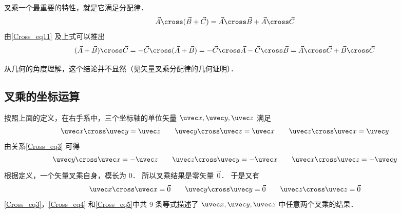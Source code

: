 叉乘一个最重要的特性，就是它满足分配律．
\begin{equation}\label{Cross_eq6}
\vec A \cross (\vec B +\vec C) = \vec A \cross \vec B + \vec A \cross \vec C
\end{equation}
由\autoref{Cross_eq11} 及上式可以推出
\begin{equation}\label{Cross_eq7}
(\vec A + \vec B) \cross \vec C =  - \vec C \cross (\vec A + \vec B) =  - \vec C \cross \vec A - \vec C \cross \vec B = \vec A \cross \vec C + \vec B \cross \vec C
\end{equation}

从几何的角度理解，这个结论并不显然（见矢量叉乘分配律的几何证明）．

\subsection{叉乘的坐标运算}

按照上面的定义，在右手系中，三个坐标轴的单位矢量 $\uvec x, \uvec y, \uvec z$ 满足
\begin{equation}\label{Cross_eq3}
\uvec x \cross \uvec y = \uvec z
\qquad
\uvec y \cross \uvec z = \uvec x
\qquad
\uvec z \cross \uvec x = \uvec y
\end{equation}
由关系\autoref{Cross_eq3} 可得
\begin{equation}\label{Cross_eq4}
\uvec y \cross \uvec x =  - \uvec z
\qquad
\uvec z \cross \uvec y =  - \uvec x
\qquad
\uvec x \cross \uvec z =  - \uvec y
\end{equation}
根据定义，一个矢量叉乘自身，模长为 $0$． 所以叉乘结果是零矢量 $\vec 0$． 于是又有
\begin{equation}\label{Cross_eq5}
\uvec x \cross \uvec x = \vec 0
\qquad
\uvec y \cross \uvec y = \vec 0
\qquad
\uvec z \cross \uvec z = \vec 0
\end{equation}
\autoref{Cross_eq3}，\autoref{Cross_eq4} 和\autoref{Cross_eq5}中共 9 条等式描述了 $\uvec x, \uvec y, \uvec z$ 中任意两个叉乘的结果．



